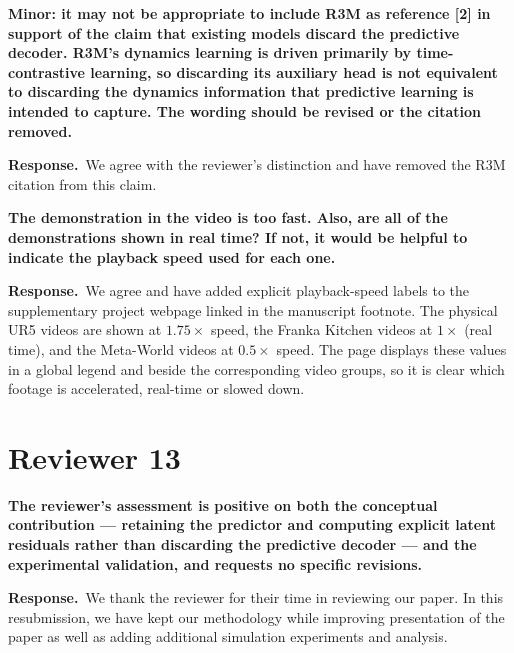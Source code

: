 \documentclass[11pt,a4paper]{article}
\newcommand{\C}[1]{\textbf{#1}\par\vspace{2pt}}
\newcommand{\R}[1]{\textbf{Response.}~#1}
\begin{document}
\begin{qa}
\item \C{Minor: it may not be appropriate to include R3M as reference [2] in support of the claim
that existing models discard the predictive decoder. R3M's dynamics learning is driven primarily by
time-contrastive learning, so discarding its auxiliary head is not equivalent to discarding the
dynamics information that predictive learning is intended to capture. The wording should be revised
or the citation removed.}
\R{We agree with the reviewer's distinction and have removed the R3M citation from this claim.}

\item \C{The demonstration in the video is too fast. Also, are all of the demonstrations shown in
real time? If not, it would be helpful to indicate the playback speed used for each one.}
\R{We agree and have added explicit playback-speed labels to the supplementary project webpage
linked in the manuscript footnote. The physical UR5 videos are shown at $1.75\times$ speed, the
Franka Kitchen videos at $1\times$ (real time), and the Meta-World videos at $0.5\times$ speed. The
page displays these values in a global legend and beside the corresponding video groups, so it is
clear which footage is accelerated, real-time or slowed down.}

\end{qa}

\section{Reviewer 13}

\begin{qa}

\item \C{The reviewer's assessment is positive on both the conceptual contribution --- retaining
the predictor and computing explicit latent residuals rather than discarding the predictive decoder
--- and the experimental validation, and requests no specific revisions.}
\R{We thank the reviewer for their time in reviewing our paper. In this resubmission, we
have kept our methodology while improving presentation of the paper as well as adding additional simulation experiments and analysis. }

\end{qa}


\end{document}

